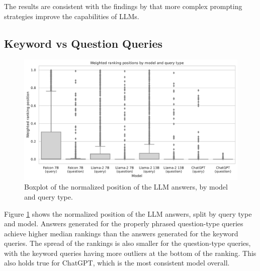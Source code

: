 The results are consistent with the findings by \cite{reynolds:2021:Prompt} that more complex prompting strategies improve the capabilities of LLMs.

\subsection{Keyword vs Question Queries}
\begin{figure}
    \centering
    \includegraphics[width=\textwidth]{images/weighted_position_boxplot_by_model_and_question.pdf}
    \caption{Boxplot of the normalized position of the LLM answers, by model and query type.}
    \label{fig:weighted_position_boxplot_by_model_and_question}
\end{figure}
Figure \ref{fig:weighted_position_boxplot_by_model_and_question} shows the normalized position of the LLM answers, split by query type and model.
Answers generated for the properly phrased question-type queries achieve higher median rankings than the answers generated for the keyword queries.
The spread of the rankings is also smaller for the question-type queries, with the keyword queries having more outliers at the bottom of the ranking.
This also holds true for ChatGPT, which is the most consistent model overall.


